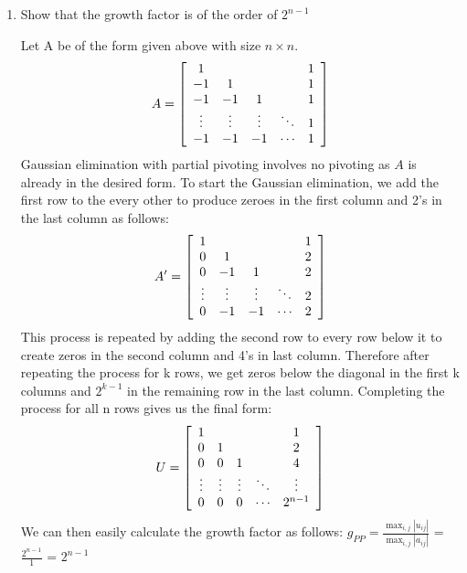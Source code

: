\documentclass[12pt,letterpaper,reqno]{amsart}
\begin{document}
\begin{enumerate}
\begin{enumerate}
    \newpage
    \item Show that the growth factor is of the order of $2^{n-1}$\newline
    \begin{flushleft}
    Let A be of the form given above with size $n \times n$.
    $$A = \left[ \begin{array} { c c c c c } { 1 } & { } & { } & { } & { 1 } \\ { - 1 } & { 1 } & { } & { } & { 1 } \\ { - 1 } & { - 1 } & { 1 } & { } & { 1 } \\ { \vdots } & { \vdots } & { \vdots } & { \ddots } & { 1 } \\ { - 1 } & { - 1 } & { - 1 } & { \cdots } & { 1 } \end{array} \right]$$
    Gaussian elimination with partial pivoting involves no pivoting as $A$ is already in the desired form. To start the Gaussian elimination, we add the first row to the every other to produce zeroes in the first column and 2's in the last column as follows:
    $$A^\prime = \left[ \begin{array} { c c c c c } { 1 } & { } & { } & { } & { 1 } \\ { 0 } & { 1 } & { } & { } & { 2 } \\ { 0 } & { - 1 } & { 1 } & { } & { 2 } \\ { \vdots } & { \vdots } & { \vdots } & { \ddots } & { 2 } \\ { 0 } & { - 1 } & { - 1 } & { \cdots } & { 2 } \end{array} \right]$$
    This process is repeated by adding the second row to every row below it to create zeros in the second column and 4's in last column. Therefore after repeating the process for k rows, we get zeros below the diagonal in the first k columns and $2^{k-1}$ in the remaining row in the last column. Completing the process for all n rows gives us the final form:
    $$U = \left[ \begin{array} { c c c c c } { 1 } & { } & { } & { } & { 1 } \\ { 0 } & { 1 } & { } & { } & { 2 } \\ { 0 } & { 0 } & { 1 } & { } & { 4 } \\ { \vdots } & { \vdots } & { \vdots } & { \ddots } & { \vdots } \\ { 0 } & { 0 } & { 0 } & { \cdots } & { 2^{n-1} } \end{array} \right]$$
    We can then easily calculate the growth factor as follows: $g _ { P P } = \frac { \max _ { i , j } \left| u _ { i j } \right| } { \max _ { i , j } \left| a _ { i j } \right| }$ = $\frac{2^{n-1}}{1}$ = $2^{n-1}$

\end{flushleft}
\end{enumerate}
\end{enumerate}
\end{document}
